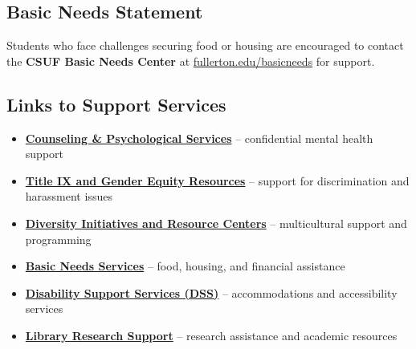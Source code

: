 \documentclass[12pt]{article}
\begin{document}
\subsection*{Basic Needs Statement}
Students who face challenges securing food or housing are encouraged to contact the \textbf{CSUF Basic Needs Center} at \href{https://www.fullerton.edu/basicneeds}{fullerton.edu/basicneeds} for support.

\subsection*{Links to Support Services}
\begin{itemize}
\item \textbf{\href{https://www.fullerton.edu/caps/}{Counseling \& Psychological Services}} -- confidential mental health support
\item \textbf{\href{https://www.fullerton.edu/titleix/}{Title IX and Gender Equity Resources}} -- support for discrimination and harassment issues
\item \textbf{\href{https://www.fullerton.edu/dirc/}{Diversity Initiatives and Resource Centers}} -- multicultural support and programming
\item \textbf{\href{https://www.fullerton.edu/basicneeds/}{Basic Needs Services}} -- food, housing, and financial assistance
\item \textbf{\href{https://www.fullerton.edu/dss/}{Disability Support Services (DSS)}} -- accommodations and accessibility services
\item \textbf{\href{https://www.library.fullerton.edu/}{Library Research Support}} -- research assistance and academic resources
\end{itemize}
\end{document}
